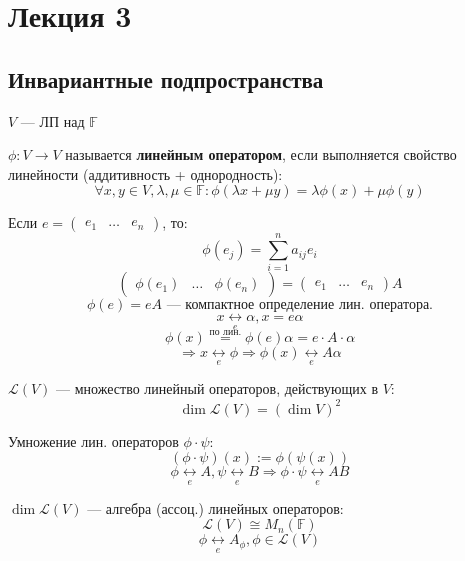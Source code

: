 \section{Лекция 3}
\subsection{Инвариантные подпространства}
$V$ --- ЛП над $\mathbb{F}$
\begin{definition}
  $\phi \colon V \rightarrow V$ называется \textbf{линейным оператором}, если выполняется свойство линейности (аддитивность + однородность):
  \[
    \forall x, y \in V, \lambda, \mu \in \mathbb{F}\colon \phi(\lambda x + \mu y) = \lambda \phi(x) + \mu \phi(y)
  \]    
\end{definition}
\begin{note}
  Если $e = \begin{pmatrix}e_1 & \ldots & e_n \end{pmatrix}$, то:
  \[
  \phi(e_j) = \sum_{i = 1}^{n} a_{ij} e_i
  \]
  \[
    \begin{pmatrix}\phi(e_1) & \ldots & \phi(e_n) \end{pmatrix} = \begin{pmatrix}e_1 & \ldots & e_n \end{pmatrix} A
  \]
  \[
  \phi(e) = eA \text{ --- компактное определение лин. оператора.}
  \]
  \[
  x \underset{e}{\longleftrightarrow} \alpha, x = e\alpha 
  \]
  \[
  \phi(x) \overset{\text{по лин.}}{=} \phi(e) \alpha = e \cdot A \cdot \alpha 
  \]
  \[
  \Rightarrow x \underset{e}{\longleftrightarrow} \phi \Rightarrow \phi(x) \underset{e}{\longleftrightarrow} A \alpha
  \]
\end{note}
\begin{symb}
  $\mathcal{L}(V)$ --- множество линейный операторов, действующих в $V$:
  \[
  \dim \mathcal{L}(V) = (\dim V)^{2}
  \]
\end{symb}
\begin{definition}
  Умножение лин. операторов $\phi \cdot \psi$:
  \[
    (\phi \cdot \psi)(x) := \phi(\psi(x))
  \]
  \[
    \phi \underset{e}{\longleftrightarrow} A, \psi \underset{e}{\longleftrightarrow} B \Rightarrow \phi \cdot \psi \underset{e}{\longleftrightarrow} AB
  \]
\end{definition}
\begin{note}
  $\dim \mathcal{L}(V)$ --- алгебра (ассоц.) линейных операторов:
  \[
  \mathcal{L}(V) \cong M_n(\mathbb{F})
  \]
  \[
  \phi \underset{e}{\longleftrightarrow} A_\phi, \phi \in \mathcal{L}(V)
  \]
\end{note}
